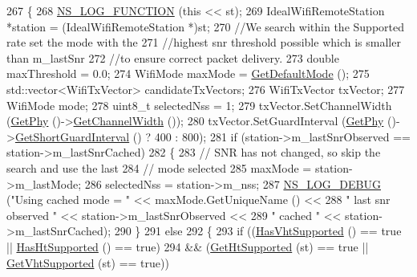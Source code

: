 \begin{DoxyCode}
267 \{
268   \hyperlink{log-macros-disabled_8h_a90b90d5bad1f39cb1b64923ea94c0761}{NS\_LOG\_FUNCTION} (\textcolor{keyword}{this} << st);
269   IdealWifiRemoteStation *station = (IdealWifiRemoteStation *)st;
270   \textcolor{comment}{//We search within the Supported rate set the mode with the}
271   \textcolor{comment}{//highest snr threshold possible which is smaller than m\_lastSnr}
272   \textcolor{comment}{//to ensure correct packet delivery.}
273   \textcolor{keywordtype}{double} maxThreshold = 0.0;
274   WifiMode maxMode = \hyperlink{classns3_1_1WifiRemoteStationManager_a54cc63cdbc8067b7f737be74a9e0081c}{GetDefaultMode} ();
275   std::vector<WifiTxVector> candidateTxVectors;
276   WifiTxVector txVector;
277   WifiMode mode;
278   uint8\_t selectedNss = 1;
279   txVector.SetChannelWidth (\hyperlink{classns3_1_1WifiRemoteStationManager_ab92b49cf78e0b72a51f5d13a1f15e242}{GetPhy} ()->\hyperlink{classns3_1_1WifiRemoteStationManager_a918213c5b9fa629c4986f6d90521bbd4}{GetChannelWidth} ());
280   txVector.SetGuardInterval (\hyperlink{classns3_1_1WifiRemoteStationManager_ab92b49cf78e0b72a51f5d13a1f15e242}{GetPhy} ()->\hyperlink{classns3_1_1WifiRemoteStationManager_aa55f6cb04128c88710119c8289f1b17e}{GetShortGuardInterval} () ? 400 : 800);
281   \textcolor{keywordflow}{if} (station->m\_lastSnrObserved == station->m\_lastSnrCached)
282     \{
283       \textcolor{comment}{// SNR has not changed, so skip the search and use the last}
284       \textcolor{comment}{// mode selected}
285       maxMode = station->m\_lastMode;
286       selectedNss = station->m\_nss;
287       \hyperlink{group__logging_ga413f1886406d49f59a6a0a89b77b4d0a}{NS\_LOG\_DEBUG} (\textcolor{stringliteral}{"Using cached mode = "} << maxMode.GetUniqueName () <<
288                     \textcolor{stringliteral}{" last snr observed "} << station->m\_lastSnrObserved <<
289                     \textcolor{stringliteral}{" cached "} << station->m\_lastSnrCached);
290     \}
291   \textcolor{keywordflow}{else}
292     \{
293       \textcolor{keywordflow}{if} ((\hyperlink{classns3_1_1WifiRemoteStationManager_afae2836c7785854272d73bf33e58c95a}{HasVhtSupported} () == \textcolor{keyword}{true} || \hyperlink{classns3_1_1WifiRemoteStationManager_ac792dc8f3c77d507d25de0b87b52608c}{HasHtSupported} () == \textcolor{keyword}{true})
294           && (\hyperlink{classns3_1_1WifiRemoteStationManager_a84f0f86ec191bd3a00c531f1e9639f96}{GetHtSupported} (st) == \textcolor{keyword}{true} || \hyperlink{classns3_1_1WifiRemoteStationManager_aecf5ed3203b9b55cd831696a08daa5fe}{GetVhtSupported} (st) == \textcolor{keyword}{true}))

\end{DoxyCode}
